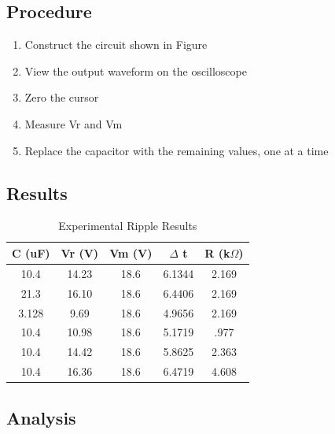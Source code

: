 \documentclass[12pt,letterpaper]{report}
\begin{document}
\subsection*{Procedure}

\begin{enumerate}
\item Construct the circuit shown in Figure %
\item View the output waveform on the oscilloscope
\item Zero the cursor
\item Measure Vr and Vm
\item Replace the capacitor with the remaining values, one at a time
\end{enumerate}

\subsection*{Results}

\begin{table}[ht]
\caption{Experimental Ripple Results} %
\centering 
    \begin{tabular}{| c | c | c | c | c |}
    \hline  
    C (uF) & Vr (V) & Vm (V) & $\Delta$ t & R (k$\Omega$) \\
    \hline
    10.4 & 14.23 & 18.6 & 6.1344 & 2.169 \\
    21.3 &16.10 & 18.6& 6.4406 & 2.169 \\
    3.128 & 9.69 & 18.6& 4.9656 &  2.169 \\
    10.4 & 10.98 &18.6& 5.1719 &.977 \\
    10.4 &14.42 & 18.6& 5.8625 & 2.363 \\
    10.4 &16.36 &18.6& 6.4719 & 4.608 \\
    \hline
    \end{tabular}
    \label{table:vpp}
\end{table}


\subsection*{Analysis}
\end{document}
